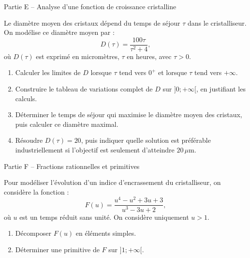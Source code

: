 \documentclass[10pt,a4paper]{article}
\begin{document}
	\begin{partbox}{Partie E -- Analyse d'une fonction de croissance cristalline}
		
		Le diamètre moyen des cristaux dépend du temps de séjour $\tau$ dans le cristalliseur. On modélise ce diamètre moyen par :
		\[
		D(\tau)=\frac{100\tau}{\tau^2+4},
		\]
		où $D(\tau)$ est exprimé en micromètres, $\tau$ en heures, avec $\tau>0$.
		
		\begin{enumerate}
			\item Calculer les limites de $D$ lorsque $\tau$ tend vers $0^+$ et lorsque $\tau$ tend vers $+\infty$.
			
			\item Construire le tableau de variations complet de $D$ sur $]0;+\infty[$, en justifiant les calculs.
			
			\item Déterminer le temps de séjour qui maximise le diamètre moyen des cristaux, puis calculer ce diamètre maximal.
			
			\item Résoudre $D(\tau)=20$, puis indiquer quelle solution est préférable industriellement si l'objectif est seulement d'atteindre $20\,\mu\mathrm{m}$.
		\end{enumerate}
		
	\end{partbox}
	
	\begin{partbox}{Partie F -- Fractions rationnelles et primitives}
		
		Pour modéliser l'évolution d'un indice d'encrassement du cristalliseur, on considère la fonction :
		\[
		F(u)=\frac{u^4-u^2+3u+3}{u^3-3u+2},
		\]
		où $u$ est un temps réduit sans unité. On considère uniquement $u>1$.
		
		\begin{enumerate}
			\item Décomposer $F(u)$ en éléments simples.
			
			\item Déterminer une primitive de $F$ sur $]1;+\infty[$.
		\end{enumerate}
		
	\end{partbox}
	
\end{document}
